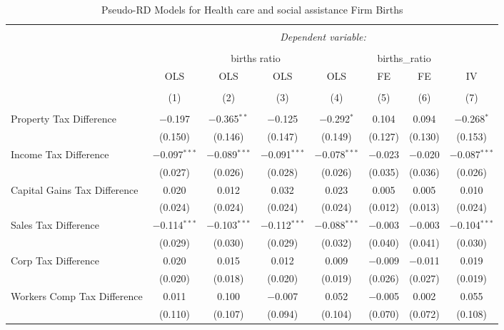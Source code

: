 
\begin{table}[!htbp] \centering 
  \caption{Pseudo-RD Models for  Health care and social assistance Firm Births} 
  \label{} 
\begin{tabular}{@{\extracolsep{5pt}}lccccccc} 
\\[-1.8ex]\hline 
\hline \\[-1.8ex] 
 & \multicolumn{7}{c}{\textit{Dependent variable:}} \\ 
\cline{2-8} 
\\[-1.8ex] & \multicolumn{4}{c}{births ratio} & \multicolumn{2}{c}{births\_ratio} &   \\ 
 & OLS & OLS & OLS & OLS & FE & FE & IV \\ 
\\[-1.8ex] & (1) & (2) & (3) & (4) & (5) & (6) & (7)\\ 
\hline \\[-1.8ex] 
 Property Tax Difference & $-$0.197 & $-$0.365$^{**}$ & $-$0.125 & $-$0.292$^{*}$ & 0.104 & 0.094 & $-$0.268$^{*}$ \\ 
  & (0.150) & (0.146) & (0.147) & (0.149) & (0.127) & (0.130) & (0.153) \\ 
  Income Tax Difference & $-$0.097$^{***}$ & $-$0.089$^{***}$ & $-$0.091$^{***}$ & $-$0.078$^{***}$ & $-$0.023 & $-$0.020 & $-$0.087$^{***}$ \\ 
  & (0.027) & (0.026) & (0.028) & (0.026) & (0.035) & (0.036) & (0.026) \\ 
  Capital Gains Tax Difference & 0.020 & 0.012 & 0.032 & 0.023 & 0.005 & 0.005 & 0.010 \\ 
  & (0.024) & (0.024) & (0.024) & (0.024) & (0.012) & (0.013) & (0.024) \\ 
  Sales Tax Difference & $-$0.114$^{***}$ & $-$0.103$^{***}$ & $-$0.112$^{***}$ & $-$0.088$^{***}$ & $-$0.003 & $-$0.003 & $-$0.104$^{***}$ \\ 
  & (0.029) & (0.030) & (0.029) & (0.032) & (0.040) & (0.041) & (0.030) \\ 
  Corp Tax Difference & 0.020 & 0.015 & 0.012 & 0.009 & $-$0.009 & $-$0.011 & 0.019 \\ 
  & (0.020) & (0.018) & (0.020) & (0.019) & (0.026) & (0.027) & (0.019) \\ 
  Workers Comp Tax Difference & 0.011 & 0.100 & $-$0.007 & 0.052 & $-$0.005 & 0.002 & 0.055 \\ 
  & (0.110) & (0.107) & (0.094) & (0.104) & (0.070) & (0.072) & (0.108) \\ 

\end{tabular}
\end{table}
